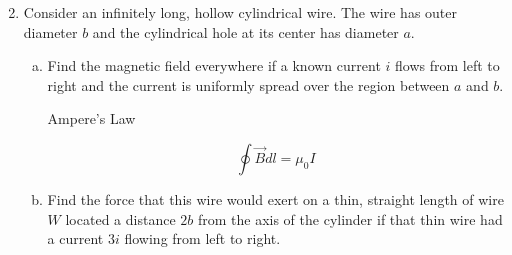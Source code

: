 \documentclass[fleqn]{article}
\begin{document}
	\begin{enumerate}
		\setcounter{enumi}{1}
		\item 
			Consider an infinitely long, hollow cylindrical wire. The wire has outer diameter $b$ and the cylindrical hole at its center has diameter $a$.
			\begin{enumerate}[a)]
				\item 
					Find the magnetic field everywhere if a known current $i$ flows from left to right and the current is uniformly spread over the region between $a$ and $b$.\\
					\begin{center}
						Ampere's Law
					\end{center}
					$$\oint\vec{B}dl = \mu_0I$$
				\item
					Find the force that this wire would exert on a thin, straight length of wire $W$ located a distance $2b$ from the axis of the cylinder if that thin wire had a current $3i$ flowing from left to right.\\
			\end{enumerate}
	\end{enumerate}
\end{document}
